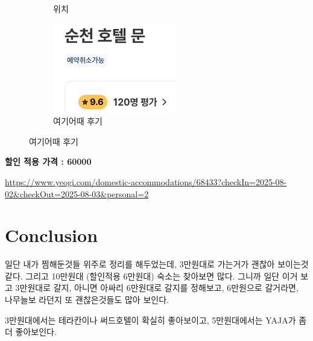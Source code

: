 \documentclass[10pt]{article}
\begin{document}
\begin{figure}[htbp]
\begin{subfigure}{0.3\textwidth}
    \caption{위치}
    \label{fig:2}
  \end{subfigure}
  \hfill
  \begin{subfigure}{0.3\textwidth}
    \centering
    \includegraphics[width=\linewidth]{fig/5_후기.png}
    \caption{여기어때 후기}
    \label{fig:3}
  \end{subfigure}
  \label{fig:three}
\end{figure}
\begin{center}
\textbf{할인 적용 가격 : 60000}
\end{center}
\url{https://www.yeogi.com/domestic-accommodations/68433?checkIn=2025-08-02&checkOut=2025-08-03&personal=2}
\newpage
\section{Conclusion}
일단 내가 찜해둔것들 위주로 정리를 해두었는데, 3만원대로 가는거가 괜찮아 보이는것 같다. 
그리고 10만원대 (할인적용 6만원대) 숙소는 찾아보면 많다. 그니까 일단 이거 보고 3만원대로 갈지, 아니면 아싸리 6만원대로 갈지를 정해보고, 
6만원으로 갈거라면, 나무늘보 라던지 또 괜찮은것들도 많아 보인다. 

3만원대에서는 테라칸이나 써드호텔이 확실히 좋아보이고, 5만원대에서는 YAJA가 좀더 좋아보인다. 
\end{document}
